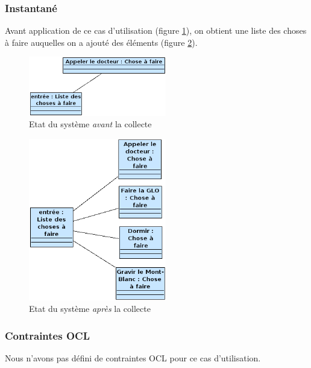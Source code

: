 \subsubsection{Instantané}
Avant application de ce cas d'utilisation (figure \ref{collect1}), on obtient une liste des choses à faire auquelles on a ajouté des éléments (figure \ref{collect2}).

\begin{figure}[!ht]
\begin{center}
\includegraphics[width=6cm]{images/Instantane_Collect_1.png}
\caption{Etat du système \emph{avant} la collecte}
\label{collect1}
\end{center}
\end{figure}

\begin{figure}[!ht]
\begin{center}
\includegraphics[width=6cm]{images/Instantane_Collect_2.png}
\caption{Etat du système \emph{après} la collecte}
\label{collect2}
\end{center}
\end{figure}

\subsubsection{Contraintes OCL}

Nous n'avons pas défini de contraintes OCL pour ce cas d'utilisation.

